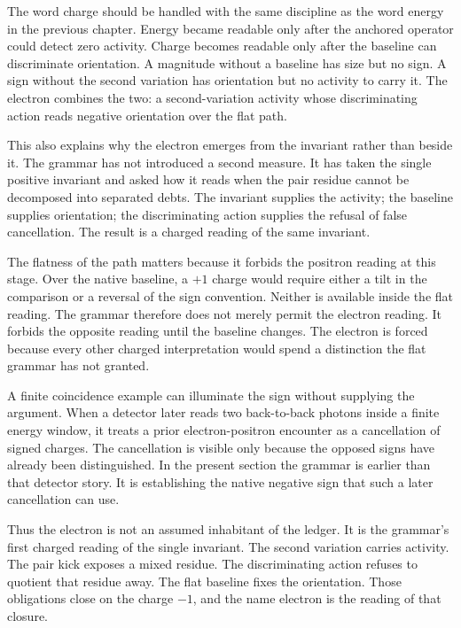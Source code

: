 The word charge should be handled with the same discipline as the word
energy in the previous chapter. Energy became readable only after the
anchored operator could detect zero activity. Charge becomes readable only
after the baseline can discriminate orientation. A magnitude without a
baseline has size but no sign. A sign without the second variation has
orientation but no activity to carry it. The electron combines the two: a
second-variation activity whose discriminating action reads negative
orientation over the flat path.

This also explains why the electron emerges from the invariant rather than
beside it. The grammar has not introduced a second measure. It has taken the
single positive invariant and asked how it reads when the pair residue cannot
be decomposed into separated debts. The invariant supplies the activity; the
baseline supplies orientation; the discriminating action supplies the refusal
of false cancellation. The result is a charged reading of the same invariant.

The flatness of the path matters because it forbids the positron reading at
this stage. Over the native baseline, a \(+1\) charge would require either a
tilt in the comparison or a reversal of the sign convention. Neither is
available inside the flat reading. The grammar therefore does not merely
permit the electron reading. It forbids the opposite reading until the
baseline changes. The electron is forced because every other charged
interpretation would spend a distinction the flat grammar has not granted.

A finite coincidence example can illuminate the sign without supplying the
argument. When a detector later reads two back-to-back photons inside a
finite energy window, it treats a prior electron-positron encounter as a
cancellation of signed charges. The cancellation is visible only because the
opposed signs have already been distinguished. In the present section the
grammar is earlier than that detector story. It is establishing the native
negative sign that such a later cancellation can use.

Thus the electron is not an assumed inhabitant of the ledger. It is the
grammar's first charged reading of the single invariant. The second
variation carries activity. The pair kick exposes a mixed residue. The
discriminating action refuses to quotient that residue away. The flat
baseline fixes the orientation. Those obligations close on the charge
\(-1\), and the name electron is the reading of that closure.

